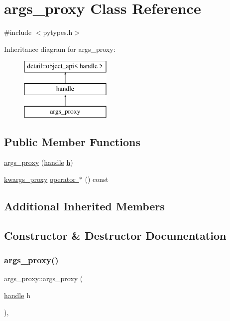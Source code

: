 \hypertarget{classargs__proxy}{}\section{args\+\_\+proxy Class Reference}
\label{classargs__proxy}


{\ttfamily \#include $<$pytypes.\+h$>$}

Inheritance diagram for args\+\_\+proxy\+:\begin{figure}[H]
\begin{center}
\leavevmode
\includegraphics[height=3.000000cm]{classargs__proxy}
\end{center}
\end{figure}
\subsection*{Public Member Functions}
\begin{DoxyCompactItemize}
\item 
\mbox{\hyperlink{classargs__proxy_ae573f34702db968299ab9df3cfa13d0d}{args\+\_\+proxy}} (\mbox{\hyperlink{classhandle}{handle}} \mbox{\hyperlink{_s_d_l__opengl__glext_8h_afa0fb1b5e976920c0abeff2dca3ed774}{h}})
\item 
\mbox{\hyperlink{classkwargs__proxy}{kwargs\+\_\+proxy}} \mbox{\hyperlink{classargs__proxy_ad126e8a87993c147059b9c35336fda4d}{operator $\ast$}} () const
\end{DoxyCompactItemize}
\subsection*{Additional Inherited Members}


\subsection{Constructor \& Destructor Documentation}
\mbox{\label{classargs__proxy_ae573f34702db968299ab9df3cfa13d0d}} 
\subsubsection{\texorpdfstring{args\_proxy()}{args\_proxy()}}
{\footnotesize\ttfamily args\+\_\+proxy\+::args\+\_\+proxy (\begin{DoxyParamCaption}\item[{\mbox{\hyperlink{classhandle}{handle}}}]{h }\end{DoxyParamCaption})\hspace{0.3cm}{\ttfamily [inline]}, {\ttfamily [explicit]}}



